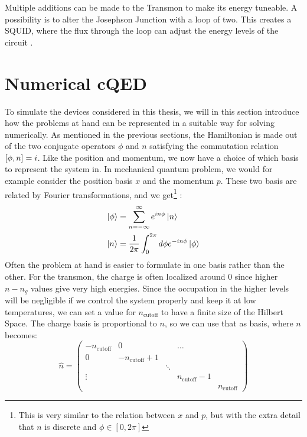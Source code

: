 Multiple additions can be made to the Transmon to make its energy tuneable. A possibility is to alter the Josephson Junction with a loop of two. This creates a SQUID, where the flux through the loop can adjust the energy levels of the circuit \cite{blais_circuit_2021}. 



\section{Numerical cQED}
To simulate the devices considered in this thesis, we will in this section introduce how the problems at hand can be represented in a suitable way for solving numerically. As mentioned in the previous sections, the Hamiltonian is made out of the two conjugate operators $\phi$ and $n$ satisfying the commutation relation $\comm{\phi}{n} = i$. Like the position and momentum, we now have a choice of which basis to represent the system in. In mechanical quantum problem, we would for example consider the position basis ${x}$ and the momentum $p$. These two basis are related by Fourier transformations, and we get\footnote{This is very similar to the relation between $x$ and $p$, but with the extra detail that $n$ is discrete and $\phi\in[0, 2\pi]$}  \cite{langford_circuit_2013}:
\begin{align}
    \ket{\phi} &= \sum_{n=-\infty}^\infty e^{in\phi}\ket{n} \\
    \ket{n} &= \frac{1}{2\pi} \int_0^{2\pi}d\phi e^{-in\phi}\ket{\phi}
\end{align}
Often the problem at hand is easier to formulate in one basis rather than the other. For the transmon, the charge is often localized around $0$ since higher $n- n_g$ values give very high energies. Since the occupation in the higher levels will be negligible if we control the system properly and keep it at low temperatures, we can set a value for $n_{\text{cutoff}}$ to have a finite size of the Hilbert Space. The charge basis is proportional to $n$, so we can use that as basis, where $n$ becomes:
\begin{equation}
    \hat{n} = \begin{pmatrix}
-n_{\text{cutoff}} & 0 &  & \ldots &  \\
0 & -n_{\text{cutoff}}+1 &  &  &  \\
 &  & \ddots &  &  \\
\vdots &  &  & n_{\text{cutoff}}-1 &  \\
 &  &  &  & n_{\text{cutoff}} 
\end{pmatrix}
\end{equation} 
